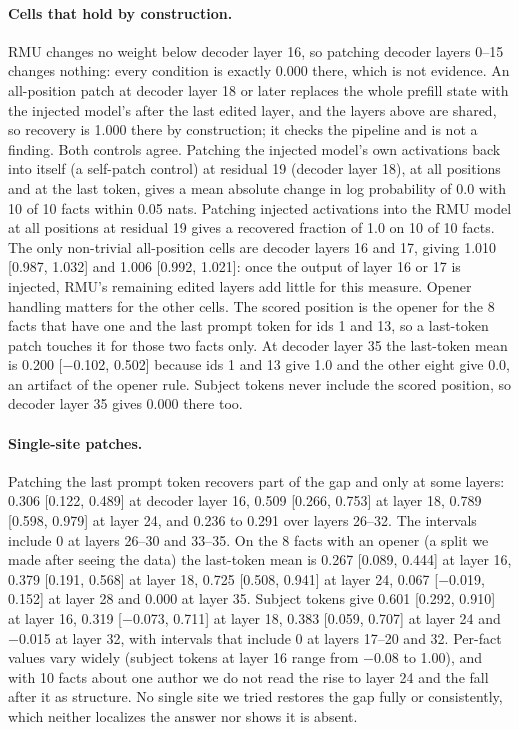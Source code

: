 \documentclass[10pt,twocolumn]{article}
\begin{document}
\paragraph{Cells that hold by construction.} RMU changes no weight below decoder layer 16, so patching decoder layers 0--15 changes nothing: every condition is exactly 0.000 there, which is not evidence. An all-position patch at decoder layer 18 or later replaces the whole prefill state with the injected model's after the last edited layer, and the layers above are shared, so recovery is 1.000 there by construction; it checks the pipeline and is not a finding. Both controls agree. Patching the injected model's own activations back into itself (a self-patch control) at residual 19 (decoder layer 18), at all positions and at the last token, gives a mean absolute change in log probability of 0.0 with 10 of 10 facts within 0.05 nats. Patching injected activations into the RMU model at all positions at residual 19 gives a recovered fraction of 1.0 on 10 of 10 facts. The only non-trivial all-position cells are decoder layers 16 and 17, giving 1.010 [0.987, 1.032] and 1.006 [0.992, 1.021]: once the output of layer 16 or 17 is injected, RMU's remaining edited layers add little for this measure. Opener handling matters for the other cells. The scored position is the opener for the 8 facts that have one and the last prompt token for ids 1 and 13, so a last-token patch touches it for those two facts only. At decoder layer 35 the last-token mean is 0.200 [$-$0.102, 0.502] because ids 1 and 13 give 1.0 and the other eight give 0.0, an artifact of the opener rule. Subject tokens never include the scored position, so decoder layer 35 gives 0.000 there too.

\paragraph{Single-site patches.} Patching the last prompt token recovers part of the gap and only at some layers: 0.306 [0.122, 0.489] at decoder layer 16, 0.509 [0.266, 0.753] at layer 18, 0.789 [0.598, 0.979] at layer 24, and 0.236 to 0.291 over layers 26--32. The intervals include 0 at layers 26--30 and 33--35. On the 8 facts with an opener (a split we made after seeing the data) the last-token mean is 0.267 [0.089, 0.444] at layer 16, 0.379 [0.191, 0.568] at layer 18, 0.725 [0.508, 0.941] at layer 24, 0.067 [$-$0.019, 0.152] at layer 28 and 0.000 at layer 35. Subject tokens give 0.601 [0.292, 0.910] at layer 16, 0.319 [$-$0.073, 0.711] at layer 18, 0.383 [0.059, 0.707] at layer 24 and $-$0.015 at layer 32, with intervals that include 0 at layers 17--20 and 32. Per-fact values vary widely (subject tokens at layer 16 range from $-$0.08 to 1.00), and with 10 facts about one author we do not read the rise to layer 24 and the fall after it as structure. No single site we tried restores the gap fully or consistently, which neither localizes the answer nor shows it is absent.
\end{document}
